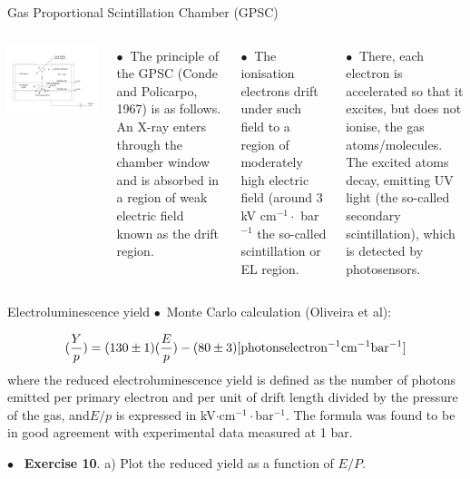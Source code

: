 \documentclass [aspectratio=169]{beamer}
\begin{document}
\begin{frame}{Gas Proportional Scintillation Chamber (GPSC)}
\begin{columns}
\includegraphics[scale=0.24]{gsc.png}


$\bullet~$ The principle of the GPSC (Conde and Policarpo, 1967) is as follows. An X-ray enters through the chamber window and is absorbed in a region of weak electric field known as the drift region. 

$\bullet~$ The ionisation electrons drift under such field to a region
of moderately high electric field (around 3 kV cm$^{-1}\cdot$ bar$^{-1}$ the so-called scintillation or EL region. 

$\bullet~$ There, each electron is accelerated so that it excites, but does not ionise, the gas atoms/molecules. The excited
atoms decay, emitting UV light (the so-called secondary scintillation), which is detected by photosensors.
\end{columns}
\end{frame}

\begin{frame}{Electroluminescence yield}
$\bullet$~Monte Carlo calculation (Oliveira et al):

\[
(\frac{Y}{p})= (130 \pm 1) (\frac{E}{p}) - (80 \pm 3) {\rm [photons electron^{-1} cm^{-1} bar^{-1}]}
\]
where the reduced electroluminescence yield is defined as the number of photons emitted per primary
electron and per unit of drift length divided by the pressure of the gas, and$E/p$ is expressed in
kV$\cdot$cm$^{-1}\cdot$bar$^{-1}$. The formula was found to be in good agreement with experimental data measured at 1 bar. 

$\bullet$~ {\bf Exercise 10}. a) Plot the reduced yield as a function of $E/P$. 

\end{frame}
\end{document}
